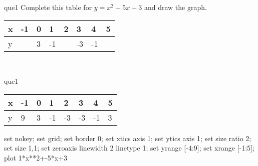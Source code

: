\documentclass[13.5pt, varwidth=true]{beamer}
\begin{document}
\begin{frame}[shrink=19,fragile]
	\begin{beamercolorbox}[rounded=true, left, shadow=true,wd=14.8cm]{que1}
		 Complete this table for $y = x^{2} - 5x + 3$ and draw the graph. \\[0.3cm] \renewcommand{\arraystretch}{1.2}\begin{tabular}{|C|C|C|C|C|C|C|C|} \hline x & -1 & 0 & 1 & 2 & 3 & 4 & 5 \\ \hline y &  & 3 & -1 &  & -3 & -1 & \\ \hline \end{tabular}\\[0.3cm]
	\end{beamercolorbox}
\end{frame}
\begin{frame}[shrink=19,fragile]
	\begin{beamercolorbox}[rounded=true, left, shadow=true,wd=14.8cm]{que1}
		\renewcommand{\arraystretch}{1.2}\begin{tabular}{|C|C|C|C|C|C|C|C|} \hline x & -1 & 0 & 1 & 2 & 3 & 4 & 5 \\ \hline y & 9 & 3 & -1 & -3 & -3 & -1 & 3\\ \hline \end{tabular}\begin{gnuplot}[terminal=pdf] set nokey; set grid; set border 0; set xtics axis 1; set ytics axis 1; set size ratio 2; set size 1,1; set zeroaxis linewidth 2 linetype 1; set yrange [-4:9]; set xrange [-1:5]; plot 1*x**2+-5*x+3 \end{gnuplot}
	\end{beamercolorbox}
\end{frame}
\end{document}
